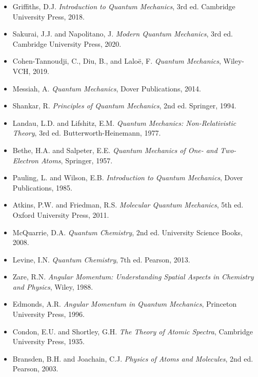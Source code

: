 \documentclass[11pt,a4paper]{article}
\begin{document}
\begin{itemize}
\item Griffiths, D.J. \textit{Introduction to Quantum Mechanics}, 3rd ed. Cambridge University Press, 2018.
\item Sakurai, J.J. and Napolitano, J. \textit{Modern Quantum Mechanics}, 3rd ed. Cambridge University Press, 2020.
\item Cohen-Tannoudji, C., Diu, B., and Laloë, F. \textit{Quantum Mechanics}, Wiley-VCH, 2019.
\item Messiah, A. \textit{Quantum Mechanics}, Dover Publications, 2014.
\item Shankar, R. \textit{Principles of Quantum Mechanics}, 2nd ed. Springer, 1994.
\item Landau, L.D. and Lifshitz, E.M. \textit{Quantum Mechanics: Non-Relativistic Theory}, 3rd ed. Butterworth-Heinemann, 1977.
\item Bethe, H.A. and Salpeter, E.E. \textit{Quantum Mechanics of One- and Two-Electron Atoms}, Springer, 1957.
\item Pauling, L. and Wilson, E.B. \textit{Introduction to Quantum Mechanics}, Dover Publications, 1985.
\item Atkins, P.W. and Friedman, R.S. \textit{Molecular Quantum Mechanics}, 5th ed. Oxford University Press, 2011.
\item McQuarrie, D.A. \textit{Quantum Chemistry}, 2nd ed. University Science Books, 2008.
\item Levine, I.N. \textit{Quantum Chemistry}, 7th ed. Pearson, 2013.
\item Zare, R.N. \textit{Angular Momentum: Understanding Spatial Aspects in Chemistry and Physics}, Wiley, 1988.
\item Edmonds, A.R. \textit{Angular Momentum in Quantum Mechanics}, Princeton University Press, 1996.
\item Condon, E.U. and Shortley, G.H. \textit{The Theory of Atomic Spectra}, Cambridge University Press, 1935.
\item Bransden, B.H. and Joachain, C.J. \textit{Physics of Atoms and Molecules}, 2nd ed. Pearson, 2003.
\end{itemize}
\end{document}
